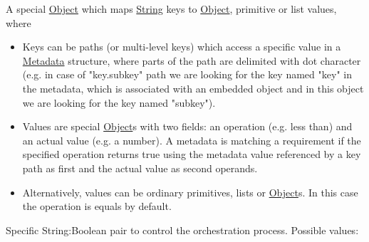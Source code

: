 \documentclass[a4paper]{arrowhead}
\newcommand{\pdef}[1]{{\textcolor{ArrowheadGrey}{#1\label{sec:model:primitives:#1}\label{sec:model:primitives:#1s}\label{sec:model:primitives:#1es}}}}
\newcommand{\pref}[1]{{\textcolor{ArrowheadGrey}{\hyperref[sec:model:primitives:#1]{#1}}}}
\begin{document}

A special \pref{Object} which maps \pref{String} keys to \pref{Object}, primitive or list values, where 

\begin{itemize}
    \item Keys can be paths (or multi-level keys) which access a specific value in a \hyperref[sec:model:Metadata]{Metadata} structure, where parts of the path are delimited with dot character (e.g. in case of "key.subkey" path we are looking for the key named "key" in the metadata, which is associated with an embedded object and in this object we are looking for the key named "subkey").
    \item Values are special \pref{Object}s with two fields: an operation (e.g. less than) and an actual value (e.g. a number). A metadata is matching a requirement if the specified operation returns true using the metadata value referenced by a key path as first and the actual value as second operands. 
    \item Alternatively, values can be ordinary primitives, lists or \pref{Object}s. In this case the operation is equals by default.
\end{itemize}


Specific \pdef{String}:\pdef{Boolean} pair to control the orchestration process. Possible values:
\end{document}
